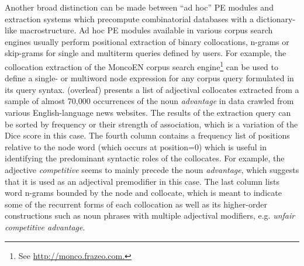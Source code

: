 \documentclass[output=paper]{langscibook}
\begin{document}
Another broad distinction can be made between ``ad hoc'' PE modules and extraction systems which precompute combinatorial databases with a dictionary-like macrostructure. Ad hoc PE modules available in various corpus search engines usually perform positional extraction of binary collocations, n-grams or skip-grams for single and multiterm queries defined by users. For example, the collocation extraction of the MoncoEN corpus search engine\footnote{See \url{http://monco.frazeo.com.}} can be used to define a single- or multiword node expression for any corpus query formulated in its query syntax.  (overleaf) presents a list of adjectival collocates extracted from a sample of almost 70,000 occurrences of the noun \textit{advantage} in data crawled from various English-language news websites. The results of the extraction query can be sorted by frequency or their strength of association, which is a variation of the Dice score in this case. The fourth column contains a frequency list of positions relative to the node word (which occurs at position=0) which is useful in identifying the predominant syntactic roles of the collocates. For example, the adjective \textit{competitive} seems to mainly precede the noun \textit{advantage}, which suggests that it is used as an adjectival premodifier in this case. The last column lists word n-grams bounded by the node and collocate, which is meant to indicate some of the recurrent forms of each collocation as well as its higher-order constructions such as noun phrases with multiple adjectival modifiers, e.g. \textit{unfair competitive advantage}.
\end{document}
